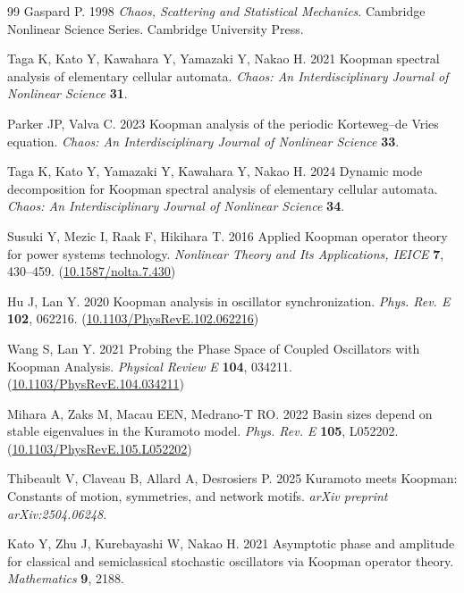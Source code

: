 \documentclass[
amsmath,amssymb,
]{revtex4-2}
\begin{document}
\begin{thebibliography}{99}
Gaspard P. 1998 {\em Chaos, Scattering and Statistical Mechanics}.
Cambridge Nonlinear Science Series. Cambridge University Press.

Taga K, Kato Y, Kawahara Y, Yamazaki Y, Nakao H. 2021  Koopman spectral analysis of elementary cellular automata. {\em Chaos: An Interdisciplinary Journal of Nonlinear Science} \textbf{31}.

Parker JP, Valva C. 2023  Koopman analysis of the periodic Korteweg--de Vries equation. {\em Chaos: An Interdisciplinary Journal of Nonlinear Science} \textbf{33}.

Taga K, Kato Y, Yamazaki Y, Kawahara Y, Nakao H. 2024  Dynamic mode decomposition for Koopman spectral analysis of elementary cellular automata. {\em Chaos: An Interdisciplinary Journal of Nonlinear Science} \textbf{34}.

Susuki Y, Mezic I, Raak F, Hikihara T. 2016  Applied Koopman operator theory for power systems technology. {\em Nonlinear Theory and Its Applications, IEICE} \textbf{7}, 430--459.
(\href{http://dx.doi.org/10.1587/nolta.7.430}{10.1587/nolta.7.430})

Hu J, Lan Y. 2020  Koopman analysis in oscillator synchronization. {\em Phys. Rev. E} \textbf{102}, 062216.
(\href{http://dx.doi.org/10.1103/PhysRevE.102.062216}{10.1103/PhysRevE.102.062216})

Wang S, Lan Y. 2021  Probing the Phase Space of Coupled Oscillators with Koopman Analysis. {\em Physical Review E} \textbf{104}, 034211.
(\href{http://dx.doi.org/10.1103/PhysRevE.104.034211}{10.1103/PhysRevE.104.034211})

Mihara A, Zaks M, Macau EEN, Medrano-T RO. 2022  Basin sizes depend on stable eigenvalues in the Kuramoto model. {\em Phys. Rev. E} \textbf{105}, L052202.
(\href{http://dx.doi.org/10.1103/PhysRevE.105.L052202}{10.1103/PhysRevE.105.L052202})

Thibeault V, Claveau B, Allard A, Desrosiers P. 2025  Kuramoto meets Koopman: Constants of motion, symmetries, and network motifs. {\em arXiv preprint arXiv:2504.06248}.

Kato Y, Zhu J, Kurebayashi W, Nakao H. 2021  Asymptotic phase and amplitude for classical and semiclassical stochastic oscillators via Koopman operator theory. {\em Mathematics} \textbf{9}, 2188.


\end{thebibliography}
\end{document}
